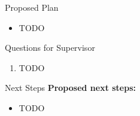 \documentclass[aspectratio=169,11pt]{beamer}
\begin{document}
\begin{frame}{Proposed Plan}
  \begin{itemize}
    \item TODO
  \end{itemize}
\end{frame}

\begin{frame}{Questions for Supervisor}
  \begin{enumerate}
    \item TODO
  \end{enumerate}
\end{frame}

\begin{frame}{Next Steps}
  \textbf{Proposed next steps:}
  \begin{itemize}
    \item TODO
  \end{itemize}

  \vspace{1em}

\end{frame}
\end{document}
